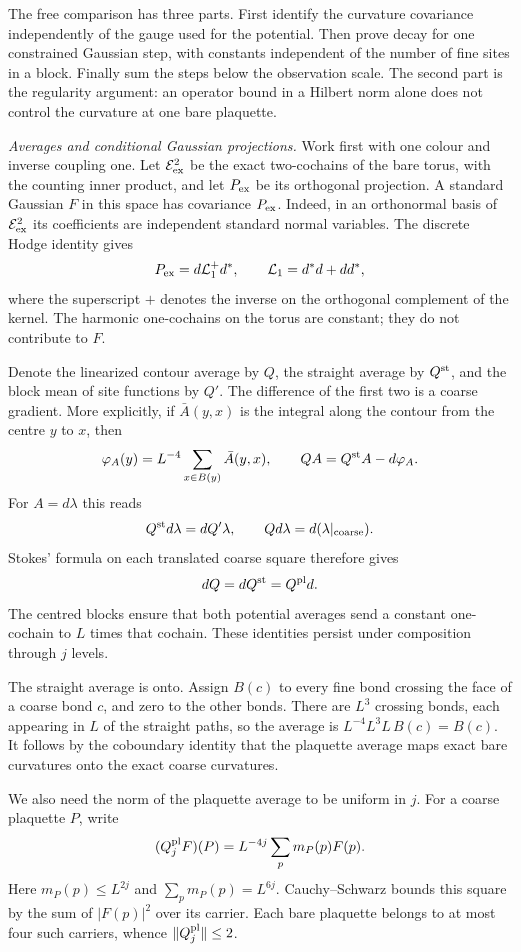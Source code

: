\documentclass[11pt,letterpaper,reqno]{amsart}
\theoremstyle{definition}
\theoremstyle{remark}
\begin{document}
The free comparison has three parts. First identify the curvature
covariance independently of the gauge used for the potential. Then
prove decay for one constrained Gaussian step, with constants
independent of the number of fine sites in a block. Finally sum the
steps below the observation scale. The second part is the regularity
argument: an operator bound in a Hilbert norm alone does not control
the curvature at one bare plaquette.

\emph{Averages and conditional Gaussian projections.}
Work first with one colour and inverse coupling one. Let
$\mathcal E^2_{\rm ex}$ be the exact two-cochains of the bare torus,
with the counting inner product, and let $P_{\rm ex}$ be its
orthogonal projection. A standard Gaussian $F$ in this space has
covariance $P_{\rm ex}$. Indeed, in an orthonormal basis of
$\mathcal E^2_{\rm ex}$ its coefficients are independent standard
normal variables. The discrete Hodge identity gives
\[
 P_{\rm ex}=d\mathcal L_1^+d^*,\qquad
 \mathcal L_1=d^*d+dd^*,
\]
where the superscript $+$ denotes the inverse on the orthogonal
complement of the kernel. The harmonic one-cochains on the torus
are constant; they do not contribute to $F$.

Denote the linearized contour average by $Q$, the straight average
by $Q^{\rm st}$, and the block mean of site functions by $Q'$.
The difference of the first two is a coarse gradient. More
explicitly, if $\bar A(y,x)$ is the integral along the contour from
the centre $y$ to $x$, then
\[
 \varphi_A(y)=L^{-4}\sum_{x\in B(y)}\bar A(y,x),\qquad
 QA=Q^{\rm st}A-d\varphi_A.
\]
For $A=d\lambda$ this reads
\[
 Q^{\rm st}d\lambda=dQ'\lambda,
 \qquad Qd\lambda=d(\lambda|_{\rm coarse}).
\]
Stokes' formula on each translated coarse square therefore gives
\[
 dQ=dQ^{\rm st}=Q^{\rm pl}d.
\]
The centred blocks ensure that both potential averages send a
constant one-cochain to $L$ times that cochain. These identities
persist under composition through $j$ levels.

The straight average is onto. Assign $B(c)$ to every fine bond
crossing the face of a coarse bond $c$, and zero to the other
bonds. There are $L^3$ crossing bonds, each appearing in $L$
of the straight paths, so the average is
$L^{-4}L^3L\,B(c)=B(c)$. It follows by the coboundary identity
that the plaquette average maps exact bare curvatures onto the
exact coarse curvatures.

We also need the norm of the plaquette average to be uniform in
$j$. For a coarse plaquette $P$, write
\[
 (Q_j^{\rm pl}F)(P)=L^{-4j}\sum_p m_P(p)F(p).
\]
Here $m_P(p)\le L^{2j}$ and $\sum_pm_P(p)=L^{6j}$.
Cauchy--Schwarz bounds this square by the sum of $|F(p)|^2$ over
its carrier. Each bare plaquette belongs to at most four such
carriers, whence $\|Q_j^{\rm pl}\|\le2$.
\end{document}
